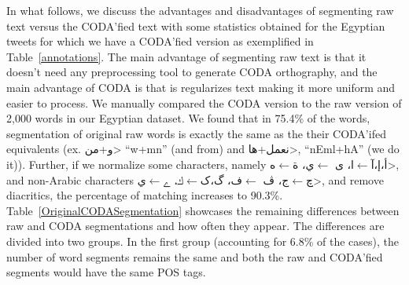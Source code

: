 \documentclass[11pt,letterpaper]{article}
\begin{document}
In what follows, we discuss the advantages and disadvantages of segmenting raw text versus the CODA'fied text with some statistics obtained for the Egyptian tweets for which we have a CODA'fied version as exemplified in Table~\ref{annotations}.  The main advantage of segmenting raw text is that it doesn't need any preprocessing tool to generate CODA orthography, and the main advantage of CODA is that is regularizes text making it more uniform and easier to process. 
We manually compared the CODA version to the raw version of 2,000 words in our Egyptian dataset.  We found that in 75.4\% of the words, segmentation of original raw words is exactly the same as the their CODA'ifed equivalents (ex. \<و+من> ``w+mn'' (and from) and \<نعمل+ها>, ``nEml+hA'' (we do it)). Further, if we normalize some characters, namely \<أ،إ،آ$\leftarrow$ا، ى
$\leftarrow$ي، ة$\leftarrow$ه>, and non-Arabic characters \<چ$\leftarrow$ج، ڤ $\leftarrow$ف، گ،ک$\leftarrow$ك، ے$\leftarrow$ي>, and remove diacritics, the percentage of matching increases to 90.3\%. Table~\ref{OriginalCODASegmentation} showcases the remaining differences between raw and CODA segmentations and how often they appear.  The differences are divided into two groups.  In the first group (accounting for 6.8\% of the cases), the number of word segments remains the same and both the raw and CODA'fied segments would have the same POS tags.  
\end{document}
